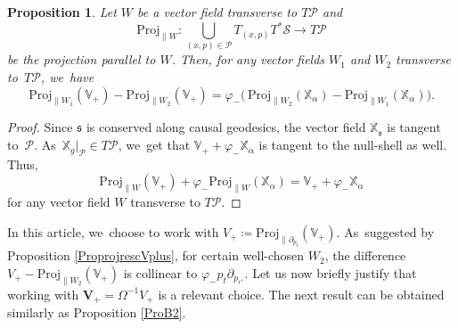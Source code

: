 \documentclass[JEP,XML,SOM,Unicode,published]{cedram}
\theoremstyle{plain}
\newtheorem{proposition}{Proposition}[section]
\theoremstyle{definition}
\newcommand\T{{\mathbb{X}}}
\begin{document}
\begin{proposition}
Let $W$ be a vector field transverse to $T \mathcal{P}$ and
\[
\mathrm{Proj}_{\parallel W} : \bigcup_{(x,p) \in \mathcal{P}} T_{(x,p)}T^* \mathcal{S} \to T \mathcal{P}
\]
be the projection parallel to $W$. Then, for any vector fields $W_1$ and $W_2$ transverse to~$T\mathcal{P}$, we~have
\[
\mathrm{Proj}_{\parallel W_1} (\mathbb{V}_+)-\mathrm{Proj}_{\parallel W_2} (\mathbb{V}_+)=\varphi_- \bigl(\, \mathrm{Proj}_{\parallel W_2} (\T_\alpha)-\mathrm{Proj}_{\parallel W_1} (\T_\alpha) \bigr).
\]
\end{proposition}
\begin{proof}
Since $\mathfrak{s}$ is conserved along causal geodesics, the vector field $\T_{\mathfrak{s}}$ is tangent to~$\mathcal{P}$. As~$\T_g\vert_{\mathcal{P}} \in T\mathcal{P}$, we~get that $\mathbb{V}_++\varphi_- \T_{\alpha}$ is tangent to the null-shell as well. Thus,
\[
\mathrm{Proj}_{\parallel W} (\mathbb{V}_+)+\varphi_- \mathrm{Proj}_{\parallel W} (\T_\alpha)= \mathbb{V}_++\varphi_- \T_\alpha
\]
for any vector field $W$ transverse to $T \mathcal{P}$.
\end{proof}

In this article, we~choose to work with $V_+ \! \coloneqq \mathrm{Proj}_{\parallel \partial_{p_t}} (\mathbb{V}_+)$. As~suggested by Proposition \ref{ProprojrescVplus}, for certain well-chosen $W_2$, the difference $V_+-\mathrm{Proj}_{\parallel W_2} (\mathbb{V}_+)$ is collinear to $\varphi_- p_t \partial_{p_{r^*}}$. Let us now briefly justify that working with $\pmb{V}_{\! +}\!=\Omega^{-1} V_+$ is a relevant choice. The next result can be obtained similarly as Proposition \ref{ProB2}.
\end{document}
